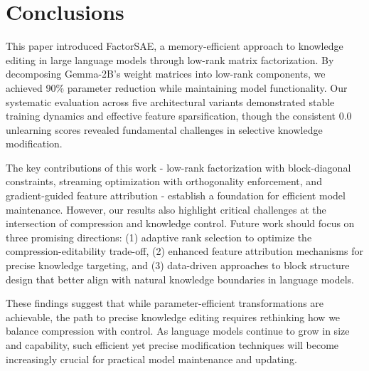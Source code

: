 \documentclass{article} %
\begin{document}
\section{Conclusions}
\label{sec:conclusion}

This paper introduced FactorSAE, a memory-efficient approach to knowledge editing in large language models through low-rank matrix factorization. By decomposing Gemma-2B's weight matrices into low-rank components, we achieved 90\% parameter reduction while maintaining model functionality. Our systematic evaluation across five architectural variants demonstrated stable training dynamics and effective feature sparsification, though the consistent 0.0 unlearning scores revealed fundamental challenges in selective knowledge modification.

The key contributions of this work - low-rank factorization with block-diagonal constraints, streaming optimization with orthogonality enforcement, and gradient-guided feature attribution - establish a foundation for efficient model maintenance. However, our results also highlight critical challenges at the intersection of compression and knowledge control. Future work should focus on three promising directions: (1) adaptive rank selection to optimize the compression-editability trade-off, (2) enhanced feature attribution mechanisms for precise knowledge targeting, and (3) data-driven approaches to block structure design that better align with natural knowledge boundaries in language models.

These findings suggest that while parameter-efficient transformations are achievable, the path to precise knowledge editing requires rethinking how we balance compression with control. As language models continue to grow in size and capability, such efficient yet precise modification techniques will become increasingly crucial for practical model maintenance and updating.



\end{document}

